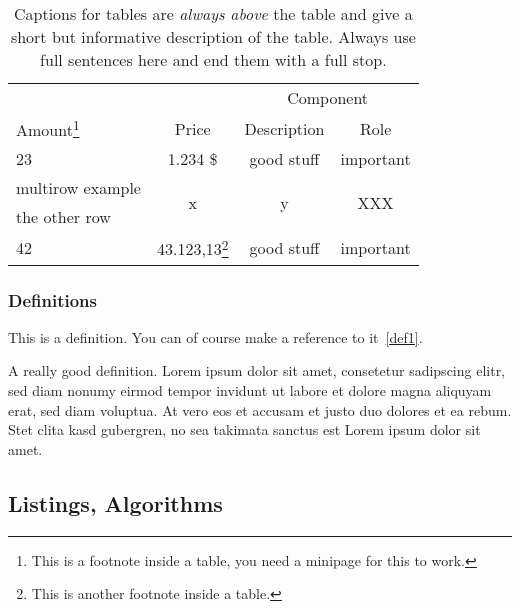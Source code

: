 \begin{table}[htbp]
	\centering
	\begin{minipage}{\textwidth} %
	\renewcommand{\footnoterule}{}
 	\renewcommand{\thefootnote}{\alph{footnote}}
	\centering
	\caption[This is the short caption for the \textit{List of Tables}.]{Captions for tables are \emph{always above} the table and give a short but informative description of the table. Always use full sentences here and end them with a full stop.}
	\label{tab1}
	\begin{tabular}{@{}lccc@{}} \toprule
	& & \multicolumn{2}{c}{Component}\\
	\cmidrule{3-4}
	Amount\footnote{This is a footnote inside a table, you need a minipage for this to work.} & Price & Description & Role \\
	\midrule
	23 & 1.234 \$ & good stuff & important\\
	\midrule
	multirow example & \multirow{2}{*}{x} & \multirow{2}{*}{y} & \multirow{2}{*}{XXX} \\
	the other row & & &\\
	\midrule
	42 & 43.123,13\footnote{This is another footnote inside a table.} & good stuff & important\\
	\bottomrule
	\end{tabular}
	\end{minipage}
\end{table}


\subsubsection{Definitions}

This is a definition. You can of course make a reference to it~\ref{def1}.

\begin{definition}[A name]\label{def1}
 A really good definition. Lorem ipsum dolor sit amet, consetetur sadipscing elitr, sed diam nonumy eirmod tempor invidunt ut labore et dolore magna aliquyam erat, sed diam voluptua. At vero eos et accusam et justo duo dolores et ea rebum. Stet clita kasd gubergren, no sea takimata sanctus est Lorem ipsum dolor sit amet.
\end{definition}


\subsection{Listings, Algorithms}

